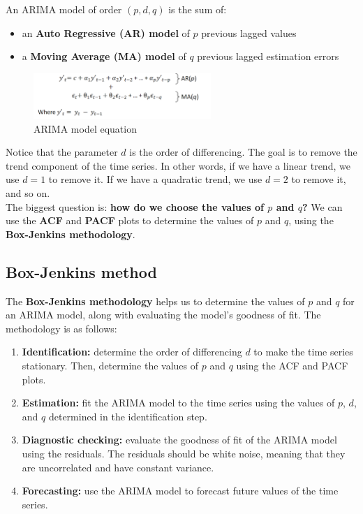 An ARIMA model of order $(p, d, q)$ is the sum of:
\begin{itemize}
    \item an \textbf{Auto Regressive (AR) model} of $p$ previous lagged values
    \item a \textbf{Moving Average (MA) model} of $q$ previous lagged estimation errors
\end{itemize}

\begin{figure}[H]
    \centering
    \includegraphics[width=0.6\textwidth]{figures/arima_eq.png}
    \caption{ARIMA model equation}
    \label{fig:arima_eq}
\end{figure}

Notice that the parameter $d$ is the order of differencing. The goal is
to remove the trend component of the time series. In other words, if we have a 
linear trend, we use $d = 1$ to remove it. If we have a quadratic trend, we use
$d = 2$ to remove it, and so on.\\

The biggest question is: \textbf{how do we choose the values of $p$ and $q$?} We can
use the \textbf{ACF} and \textbf{PACF} plots to determine the values of $p$ and $q$,
using the \textbf{Box-Jenkins methodology}.

\subsection{Box-Jenkins method}

The \textbf{Box-Jenkins methodology} helps us to determine the values of $p$ and $q$
for an ARIMA model, along with evaluating the model's goodness of fit. The methodology
is as follows:

\begin{enumerate}
    \item \textbf{Identification:} determine the order of differencing $d$ to make the
    time series stationary. Then, determine the values of $p$ and $q$ using the ACF
    and PACF plots.

    \item \textbf{Estimation:} fit the ARIMA model to the time series using the values
    of $p$, $d$, and $q$ determined in the identification step.

    \item \textbf{Diagnostic checking:} evaluate the goodness of fit of the ARIMA model
    using the residuals. The residuals should be white noise, meaning that they are
    uncorrelated and have constant variance.

    \item \textbf{Forecasting:} use the ARIMA model to forecast future values of the
    time series.
\end{enumerate}

